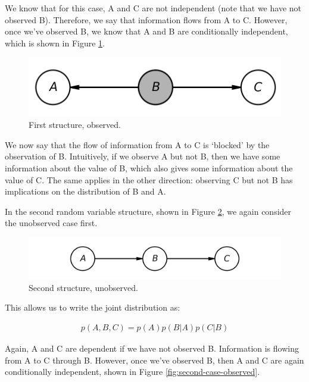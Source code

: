 We know that for this case, A and C are not independent (note that we have not observed B). Therefore, we say that information flows from A to C. However, once we've observed B, we know that A and B are conditionally independent, which is shown in Figure \ref{fig:first-case-observed}.

\begin{figure}
	\centering
	\includegraphics[width=0.35\paperwidth]{../GraphicalModels/fig/first-case-observed.png}
	\caption{First structure, observed.}
	\label{fig:first-case-observed}
\end{figure}

We now say that the flow of information from A to C is `blocked' by the observation of B. Intuitively, if we observe A but not B, then we have some information about the value of B, which also gives some information about the value of C. The same applies in the other direction: observing C but not B has implications on the distribution of B and A.

In the second random variable structure, shown in Figure \ref{fig:second-case-unobserved}, we again consider the unobserved case first.
\begin{figure}
	\centering
	\includegraphics[width=0.5\paperwidth]{../GraphicalModels/fig/second-case-unobserved.png}
	\caption{Second structure, unobserved.}
	\label{fig:second-case-unobserved}
\end{figure}

This allows us to write the joint distribution as:

\begin{align*}
	p(A, B, C) = p(A) p(B | A) p(C | B)
\end{align*}

Again, A and C are dependent if we have not observed B. Information is flowing from A to C through B. However, once we've observed B, then A and C are again conditionally independent, shown in Figure \ref{fig:second-case-observed}.

